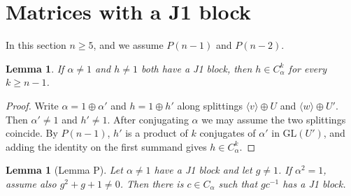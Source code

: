 \documentclass[11pt]{amsart}
\newtheorem{lemma}[theorem]{Lemma}
\theoremstyle{definition}
\theoremstyle{remark}
\newcommand{\GL}{\mathrm{GL}}
\begin{document}
\section{Matrices with a J1 block}\label{sec:J1}

In this section $n\ge5$, and we assume $P(n-1)$ and $P(n-2)$.

\begin{lemma}\label{lem:J1target}
If $\alpha\ne1$ and $h\ne1$ both have a J1 block, then $h\in C_\alpha^k$ for every $k\ge n-1$.
\end{lemma}

\begin{proof}
Write $\alpha=1\oplus\alpha'$ and $h=1\oplus h'$ along splittings $\langle v\rangle\oplus U$ and
$\langle w\rangle\oplus U'$. Then $\alpha'\ne1$ and $h'\ne1$. After conjugating $\alpha$ we may
assume the two splittings coincide. By $P(n-1)$, $h'$ is a product of $k$ conjugates of $\alpha'$
in $\GL(U')$, and adding the identity on the first summand gives $h\in C_\alpha^k$.
\end{proof}

\begin{lemma}[Lemma P]\label{lem:P}
Let $\alpha\ne1$ have a J1 block and let $g\ne1$. If $\alpha^2=1$, assume also
$g^2+g+1\ne0$. Then there is $c\in C_\alpha$ such that $gc^{-1}$ has a J1 block.
\end{lemma}
\end{document}
